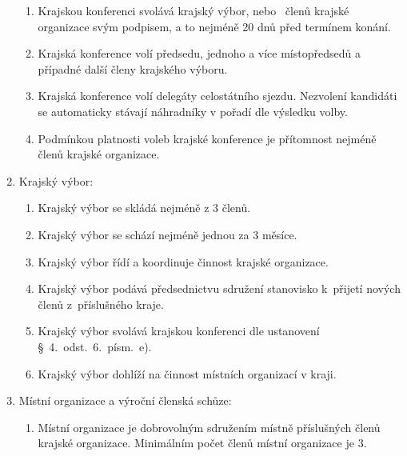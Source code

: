 \documentclass[a4paper]{article}
\begin{document}
\begin{enumerate}
\begin{enumerate}
        \item Krajskou konferenci svolává krajský výbor, nebo
            ~členů krajské organizace svým podpisem, a to
            nejméně 20 dnů před termínem konání.

        \item Krajská konference volí předsedu, jednoho a více místopředsedů a případné další členy krajského výboru.

        \item Krajská konference volí delegáty celostátního sjezdu. Nezvolení
            kandidáti se automaticky stávají náhradníky v pořadí dle výsledku
            volby.

        \item Podmínkou platnosti voleb krajské konference je přítomnost
            nejméně  členů krajské organizace.
        \end{enumerate}

    \item Krajský výbor:
        \begin{enumerate}
        \item Krajský výbor se skládá nejméně z 3 členů.

        \item Krajský výbor se schází nejméně jednou za 3 měsíce.

        \item Krajský výbor řídí a koordinuje činnost krajské organizace.

        \item Krajský výbor podává předsednictvu sdružení stanovisko k~přijetí
            nových členů z~příslušného kraje.

        \item Krajský výbor svolává krajskou konferenci dle ustanovení
            \S~4.~odst.~6.~písm.~e).

        \item Krajský výbor dohlíží na činnost místních organizací v kraji.
        \end{enumerate}

    \item Místní organizace a výroční členská schůze:
        \begin{enumerate}
        \item Místní organizace je dobrovolným sdružením místně příslušných
            členů krajské organizace. Minimálním počet členů místní organizace
            je 3.


\end{enumerate}
\end{enumerate}
\end{document}
